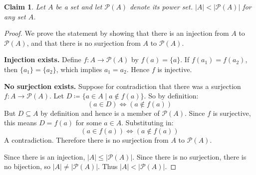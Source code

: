 \documentclass{article}
\newtheorem*{claim}{Claim}
\begin{document}
\begin{claim}
    Let $A$ be a set and let $\mathcal{P}(A)$ denote its power set. $|A| < |\mathcal{P}(A)|$ for any set $A$.
\end{claim}

\begin{proof}
    We prove the statement by showing that there is an injection from $A$ to $\mathcal{P}(A)$, and that there 
    is no surjection from $A$ to $\mathcal{P}(A)$.

    \medskip

    \textbf{Injection exists.} Define $f : A \to \mathcal{P}(A)$ by $f(a) = \{a\}$. If $f(a_1) = f(a_2)$, then 
    $\{a_1\} = \{a_2\}$, which implies $a_1 = a_2$. Hence $f$ is injective.

    \medskip

    \textbf{No surjection exists.} Suppose for contradiction that there was a surjection $f : A \to 
    \mathcal{P}(A)$. Let $D \coloneq \{a \in A \mid a \notin f(a)\}$. So by definition:
    \[
    (a \in D) \iff (a \notin f(a))
    \]
    But $D \subseteq A$ by definition and hence is a member of $\mathcal{P}(A)$. Since $f$ is surjective, this 
    means $D = f(a)$ for some $a \in A$. Substituting in:
    \[
    (a \in f(a)) \iff (a \notin f(a))
    \]
    A contradiction. Therefore there is no surjection from $A$ to $\mathcal{P}(A)$.

    \medskip

    Since there is an injection, $|A| \leq |\mathcal{P}(A)|$. Since there is no surjection, there is no bijection, 
    so $|A| \neq |\mathcal{P}(A)|$. Thus $|A| < |\mathcal{P}(A)|$.
\end{proof}
\end{document}

